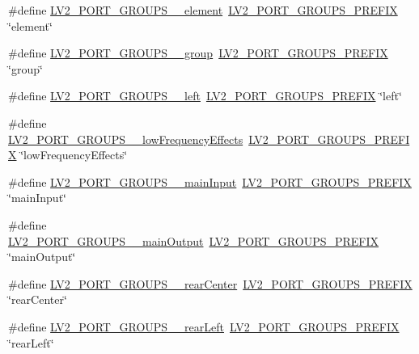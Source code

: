 \begin{DoxyCompactItemize}
\#define \hyperlink{port-groups_8h_a3925b0c3eaa7e3b8e0ae892ba45af7d4}{L\+V2\+\_\+\+P\+O\+R\+T\+\_\+\+G\+R\+O\+U\+P\+S\+\_\+\+\_\+element}~\hyperlink{port-groups_8h_ad8eff71f3c96d9bf45282fed8195fde3}{L\+V2\+\_\+\+P\+O\+R\+T\+\_\+\+G\+R\+O\+U\+P\+S\+\_\+\+P\+R\+E\+F\+IX} \char`\"{}element\char`\"{}
\item 
\#define \hyperlink{port-groups_8h_afb532161e991f32fb7041d4d06a3219e}{L\+V2\+\_\+\+P\+O\+R\+T\+\_\+\+G\+R\+O\+U\+P\+S\+\_\+\+\_\+group}~\hyperlink{port-groups_8h_ad8eff71f3c96d9bf45282fed8195fde3}{L\+V2\+\_\+\+P\+O\+R\+T\+\_\+\+G\+R\+O\+U\+P\+S\+\_\+\+P\+R\+E\+F\+IX} \char`\"{}group\char`\"{}
\item 
\#define \hyperlink{port-groups_8h_a2fb74bc21dcd622a4a0d23e17c040596}{L\+V2\+\_\+\+P\+O\+R\+T\+\_\+\+G\+R\+O\+U\+P\+S\+\_\+\+\_\+left}~\hyperlink{port-groups_8h_ad8eff71f3c96d9bf45282fed8195fde3}{L\+V2\+\_\+\+P\+O\+R\+T\+\_\+\+G\+R\+O\+U\+P\+S\+\_\+\+P\+R\+E\+F\+IX} \char`\"{}left\char`\"{}
\item 
\#define \hyperlink{port-groups_8h_a77705b1c10c357df35a727cdef6ca757}{L\+V2\+\_\+\+P\+O\+R\+T\+\_\+\+G\+R\+O\+U\+P\+S\+\_\+\+\_\+low\+Frequency\+Effects}~\hyperlink{port-groups_8h_ad8eff71f3c96d9bf45282fed8195fde3}{L\+V2\+\_\+\+P\+O\+R\+T\+\_\+\+G\+R\+O\+U\+P\+S\+\_\+\+P\+R\+E\+F\+IX} \char`\"{}low\+Frequency\+Effects\char`\"{}
\item 
\#define \hyperlink{port-groups_8h_a1793152edd719cd8960b3c8727905225}{L\+V2\+\_\+\+P\+O\+R\+T\+\_\+\+G\+R\+O\+U\+P\+S\+\_\+\+\_\+main\+Input}~\hyperlink{port-groups_8h_ad8eff71f3c96d9bf45282fed8195fde3}{L\+V2\+\_\+\+P\+O\+R\+T\+\_\+\+G\+R\+O\+U\+P\+S\+\_\+\+P\+R\+E\+F\+IX} \char`\"{}main\+Input\char`\"{}
\item 
\#define \hyperlink{port-groups_8h_a4247c0e506cb618e5ede4c0db6dfa551}{L\+V2\+\_\+\+P\+O\+R\+T\+\_\+\+G\+R\+O\+U\+P\+S\+\_\+\+\_\+main\+Output}~\hyperlink{port-groups_8h_ad8eff71f3c96d9bf45282fed8195fde3}{L\+V2\+\_\+\+P\+O\+R\+T\+\_\+\+G\+R\+O\+U\+P\+S\+\_\+\+P\+R\+E\+F\+IX} \char`\"{}main\+Output\char`\"{}
\item 
\#define \hyperlink{port-groups_8h_a6d1584283e072eeb1667ad109de67d88}{L\+V2\+\_\+\+P\+O\+R\+T\+\_\+\+G\+R\+O\+U\+P\+S\+\_\+\+\_\+rear\+Center}~\hyperlink{port-groups_8h_ad8eff71f3c96d9bf45282fed8195fde3}{L\+V2\+\_\+\+P\+O\+R\+T\+\_\+\+G\+R\+O\+U\+P\+S\+\_\+\+P\+R\+E\+F\+IX} \char`\"{}rear\+Center\char`\"{}
\item 
\#define \hyperlink{port-groups_8h_a505c49258eb76cbacd10be85f86f5607}{L\+V2\+\_\+\+P\+O\+R\+T\+\_\+\+G\+R\+O\+U\+P\+S\+\_\+\+\_\+rear\+Left}~\hyperlink{port-groups_8h_ad8eff71f3c96d9bf45282fed8195fde3}{L\+V2\+\_\+\+P\+O\+R\+T\+\_\+\+G\+R\+O\+U\+P\+S\+\_\+\+P\+R\+E\+F\+IX} \char`\"{}rear\+Left\char`\"{}

\end{DoxyCompactItemize}
